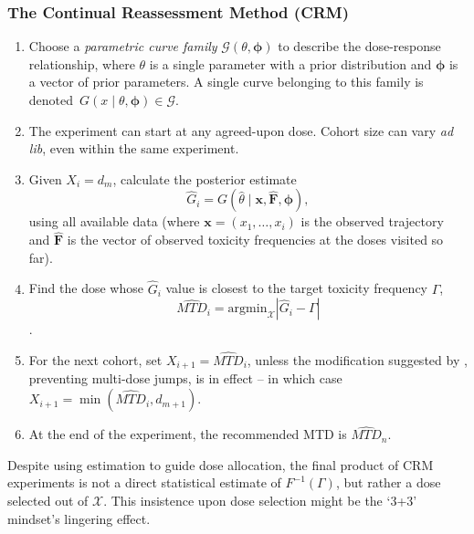 \subsubsection{The Continual Reassessment Method (CRM)}
\begin{enumerate}
\item Choose a \emph{parametric curve family} $\mathcal{G}\left(\theta,\boldsymbol{\phi}\right)$ to describe the dose-response relationship, where $\theta$ is a single parameter with a prior distribution and $\boldsymbol{\phi}$ is a vector of prior parameters. A single curve belonging to this family is denoted\ $G\left(x\mid\theta,\boldsymbol{\phi}\right)\in\mathcal{G}$.
\item The experiment can start at any agreed-upon dose. Cohort size can vary \emph{ad lib}, even within the same experiment.
\item Given $X_i=d_m$, calculate the posterior estimate
$$\hat{G}_i=G\left(\hat{\theta}\mid \mathbf{x,\hat{F}},\boldsymbol{\phi}\right),$$
using all available data (where  $\mathbf{x}=\left(x_1,\ldots ,x_i\right)$ is the observed trajectory and $\mathbf{\hat{F}}$ is the vector of observed toxicity frequencies at the doses visited so far).
\item Find the dose whose $\hat{G}_i$ value is closest to the target toxicity frequency $\Gamma$, $$\widehat{MTD}_i=\mathrm{arg min}_{\mathcal{X}}\left|\hat{G}_i-\Gamma\right|$$.
\item For the next cohort, set $X_{i+1}=\widehat{MTD}_i$, unless the modification suggested by \cite{Good:Zahu:Pian:some:1995}, preventing multi-dose jumps, is in effect -- in which case $X_{i+1}=\min\left(\widehat{MTD}_i,d_{m+1}\right)$.
\item At the end of the experiment, the recommended MTD is $\widehat{MTD}_n$.
\end{enumerate}

\noindent Despite using estimation to guide dose allocation, the final product of CRM experiments is not a direct statistical estimate of $F^{-1}(\Gamma)$, but rather a dose selected out of $\mathcal{X}$. This insistence upon dose selection might be the `3+3' mindset's lingering effect.

